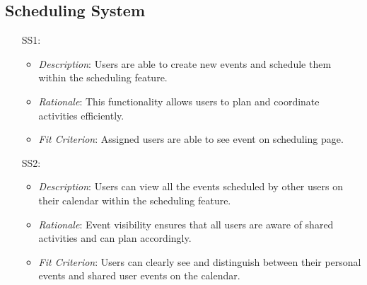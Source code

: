 \documentclass[12pt]{article}
\begin{document}
\subsection{Scheduling System}
\noindent \begin{itemize}
    \item[SS1: ]
\begin{itemize}
    \item \textit{Description}: Users are able to create new events and schedule them within the scheduling feature.
    \item \textit{Rationale}: This functionality allows users to plan and coordinate activities efficiently.
    \item \textit{Fit Criterion}: Assigned users are able to see event on scheduling page.
\end{itemize}

\item[SS2: ]
\begin{itemize}
    \item \textit{Description}: Users can view all the events scheduled by other users on their calendar within the scheduling feature.
    \item \textit{Rationale}: Event visibility ensures that all users are aware of shared activities and can plan accordingly.
    \item \textit{Fit Criterion}: Users can clearly see and distinguish between their personal events and shared user events on the calendar.
\end{itemize}
    
\end{itemize}
\end{document}
